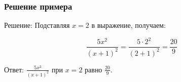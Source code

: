 \begin{frame}[label=example_solution]
\frametitle{Решение примера }
Решение: Подставляя $x=2$ в выражение, получаем:

$$\frac{5x^2}{(x+1)^2}=\frac{5\cdot 2^2}{(2+1)^2}=\frac{20}{9}$$

Ответ: $\frac{5x^2}{(x+1)^2}$ при $x=2$ равно $\frac{20}{9}$.

\hyperlink{example_solution_back}{}
\end{frame}